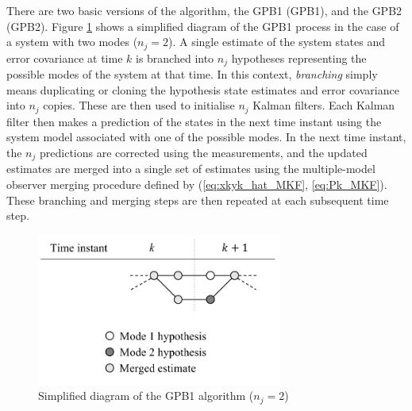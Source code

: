 {There are two basic versions of the algorithm, the \acrlong{GPB1} (\acrshort{GPB1}), and the \acrlong{GPB2} (\acrshort{GPB2}). Figure \ref{fig:mm-obs-gpb1} shows a simplified diagram of the \gls{GPB1} process in the case of a system with two modes ($n_j=2$). A single estimate of the system states and error covariance at time $k$ is branched into $n_j$ hypotheses representing the possible modes of the system at that time. In this context, \textit{branching} simply means duplicating or cloning the hypothesis state estimates and error covariance into $n_j$ copies. These are then used to initialise $n_j$ Kalman filters. Each Kalman filter then makes a prediction of the states in the next time instant using the system model associated with one of the possible modes. In the next time instant, the $n_j$ predictions are corrected using the measurements, and the updated estimates are merged into a single set of estimates using the multiple-model observer merging procedure defined by (\ref{eq:xkyk_hat_MKF}, \ref{eq:Pk_MKF}). These branching and merging steps are then repeated at each subsequent time step.
\begin{figure}[ht]
	\centering
	\includegraphics[height=5cm]{images/mm_obs_seq_gpb1.pdf}
	\caption{Simplified diagram of the \gls{GPB1} algorithm ($n_j=2$)}
	\label{fig:mm-obs-gpb1}
\end{figure}

}
